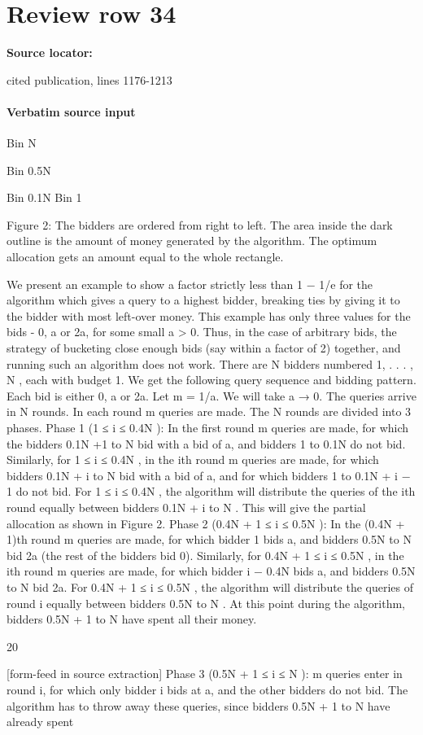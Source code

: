 \documentclass[10pt]{article}
\begin{document}
\section*{Review row 34}
\textbf{Source locator:} {\footnotesize\raggedright cited publication, lines 1176-\allowbreak{}1213\par}
\paragraph{Verbatim source input}
\begin{ReviewVerbatim}
Bin N

Bin 0.5N

Bin 0.1N Bin 1

Figure 2: The bidders are ordered from right to left. The area inside the dark outline is the amount
of money generated by the algorithm. The optimum allocation gets an amount equal to the whole
rectangle.

We present an example to show a factor strictly less than 1 − 1/e for the algorithm which gives
a query to a highest bidder, breaking ties by giving it to the bidder with most left-over money.
This example has only three values for the bids - 0, a or 2a, for some small a > 0. Thus, in
the case of arbitrary bids, the strategy of bucketing close enough bids (say within a factor of
2) together, and running such an algorithm does not work.
There are N bidders numbered 1, . . . , N , each with budget 1. We get the following query
sequence and bidding pattern. Each bid is either 0, a or 2a. Let m = 1/a. We will take a → 0.
The queries arrive in N rounds. In each round m queries are made. The N rounds are divided
into 3 phases.
Phase 1 (1 ≤ i ≤ 0.4N ): In the first round m queries are made, for which the bidders 0.1N +1
to N bid with a bid of a, and bidders 1 to 0.1N do not bid. Similarly, for 1 ≤ i ≤ 0.4N , in
the ith round m queries are made, for which bidders 0.1N + i to N bid with a bid of a, and
for which bidders 1 to 0.1N + i − 1 do not bid.
For 1 ≤ i ≤ 0.4N , the algorithm will distribute the queries of the ith round equally between
bidders 0.1N + i to N . This will give the partial allocation as shown in Figure 2.
Phase 2 (0.4N + 1 ≤ i ≤ 0.5N ): In the (0.4N + 1)th round m queries are made, for which
bidder 1 bids a, and bidders 0.5N to N bid 2a (the rest of the bidders bid 0). Similarly, for
0.4N + 1 ≤ i ≤ 0.5N , in the ith round m queries are made, for which bidder i − 0.4N bids a,
and bidders 0.5N to N bid 2a.
For 0.4N + 1 ≤ i ≤ 0.5N , the algorithm will distribute the queries of round i equally between
bidders 0.5N to N .
At this point during the algorithm, bidders 0.5N + 1 to N have spent all their money.

20


[form-feed in source extraction]
Phase 3 (0.5N + 1 ≤ i ≤ N ): m queries enter in round i, for which only bidder i bids at a,
and the other bidders do not bid.
The algorithm has to throw away these queries, since bidders 0.5N + 1 to N have already spent
\end{ReviewVerbatim}
\end{document}
